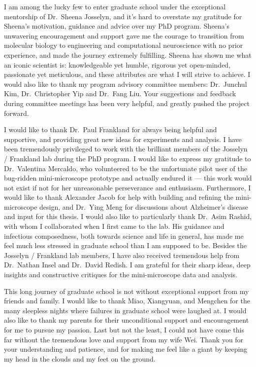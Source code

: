 I am among the lucky few to enter graduate school under the exceptional mentorship of Dr.~Sheena Josselyn, and it's hard to overstate my gratitude for Sheena's motivation, guidance and advice over my PhD program. Sheena's unwavering encouragement and support gave me the courage to transition from molecular biology to engineering and computational neuroscience with no prior experience, and made the journey extremely fulfilling. Sheena has shown me what an iconic scientist is: knowledgeable yet humble, rigorous yet open-minded, passionate yet meticulous, and these attributes are what I will strive to achieve. I would also like to thank my program advisory committee members: Dr.~Junchul Kim, Dr.~Christopher Yip and Dr.~Fang Liu. Your suggestions and feedback during committee meetings has been very helpful, and greatly pushed the project forward. 

I would like to thank Dr.~Paul Frankland for always being helpful and supportive, and providing great new ideas for experiments and analysis. I have been tremendously privileged to work with the brilliant members of the Josselyn \slash{} Frankland lab during the PhD program. I would like to express my gratitude to Dr.~Valentina Mercaldo, who volunteered to be the unfortunate pilot user of the bug-ridden mini-microscope prototype and actually endured it --- this work would not exist if not for her unreasonable perseverance and enthusiasm. Furthermore, I would like to thank Alexander Jacob for help with building and refining the mini-microscope design, and Dr.~Ying Meng for discussions about Alzheimer's disease and input for this thesis. I would also like to particularly thank Dr.~Asim Rashid, with whom I collaborated when I first came to the lab. His guidance and infectious composedness, both towards science and life in general, has made me feel much less stressed in graduate school than I am supposed to be. Besides the Josselyn \slash{} Frankland lab members, I have also received tremendous help from Dr.~Nathan Insel and Dr.~David Redish. I am grateful for their sharp ideas, deep insights and constructive critiques for the mini-microscope data and analysis. 

This long journey of graduate school is not without exceptional support from my friends and family.  I would like to thank Miao, Xiangyuan, and Mengchen for the many sleepless nights where failures in graduate school were laughed at. I would also like to thank my parents for their unconditional support and encouragement for me to pursue my passion. Last but not the least, I could not have come this far without the tremendous love and support from my wife Wei. Thank you for your understanding and patience, and for making me feel like a giant by keeping my head in the clouds and my feet on the ground. 

